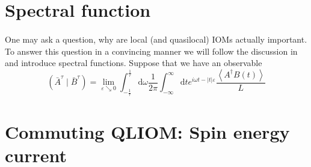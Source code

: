 
  \section{Spectral function\label{sec:spectral function}}

  \paragraph{}One may ask a question, why are local (and quasilocal) IOMs actually important. To answer this
  question in a convincing manner we will follow the discussion in~\textcite{Vidmar2021} and
  introduce spectral functions. Suppose that we have an observable  
  \begin{equation}
    \left(\bar{A}^{\tau} \mid \bar{B}^{\tau}\right)=\lim _{\varepsilon \searrow 0} \int_{-\frac{1}{\tau}}^{\frac{1}{\tau}} \mathrm{d} \omega \frac{1}{2 \pi} \int_{-\infty}^{\infty} \mathrm{d} t e^{i \omega t-|t| \varepsilon} \frac{\left\langle A^{\dagger} B(t)\right\rangle}{L}
    \end{equation}

\section{Commuting QLIOM: Spin energy current}

